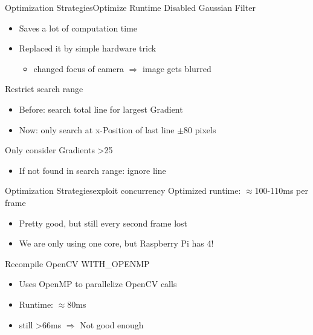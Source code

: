 \begin{frame}[plain]{Optimization Strategies}{Optimize Runtime}
\large
\pause
Disabled Gaussian Filter
\pause
\begin{itemize}
	\large
	\item Saves a lot of computation time
	\pause
	\item Replaced it by simple hardware trick
	\pause
	\begin{itemize}
		\large
		\item changed focus of camera \pause $\Rightarrow$ image gets blurred
	\end{itemize}
\end{itemize}
\pause
Restrict search range 
\pause
\begin{itemize}
	\large
	\item Before: search total line for largest Gradient
	\pause
	\item Now: only search at x-Position of last line $\pm$80 pixels
\end{itemize}
\pause
Only consider Gradients >25
\pause
\begin{itemize}
	\large
	\item If not found in search range: ignore line
\end{itemize}
\end{frame}

\begin{frame}[plain]{Optimization Strategies}{exploit concurrency}
\large
\pause
	Optimized runtime: $\approx$100-110ms per frame
	\pause
	\begin{itemize}
		\large
		\item Pretty good, but still every second frame lost
		\pause
		\item We are only using one core\pause, but Raspberry Pi has 4!
	\end{itemize}
	\pause
	\vspace{.5cm}
	Recompile OpenCV WITH\_OPENMP
	\pause
	\begin{itemize}
		\large
		\item Uses OpenMP to parallelize OpenCV calls
		\pause
		\item Runtime: $\approx$80ms 
		\pause
		\item still >66ms \pause $\Rightarrow$ Not good enough
	\end{itemize}
	
\end{frame}

